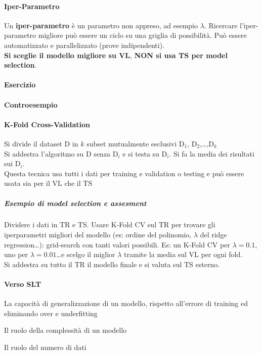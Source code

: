 \documentclass[10pt]{book}
\begin{document}
\paragraph{Iper-Parametro} Un \textbf{iper-parametro} è un parametro non appreso, ad esempio $\lambda$. Ricercare l'iper-parametro migliore può essere un ciclo su una griglia di possibilità. Può essere automatizzato e parallelizzato (prove indipendenti).\\
\textbf{Si sceglie il modello migliore su VL}, \textbf{NON si usa TS per model selection}.
\paragraph{Esercizio} %
\paragraph{Controesempio} %
\paragraph{K-Fold Cross-Validation} Si divide il dataset D in $k$ subset mutualmente esclusivi D$_1$, D$_2$,\ldots,D$_k$\\
Si addestra l'algoritmo su D senza D$_i$ e si testa su D$_i$. Si fa la media dei risultati sui D$_i$.\\
Questa tecnica usa tutti i dati per training e validation o testing e può essere usata sia per il VL che il TS
\subparagraph{Esempio di model selection e assesment} Dividere i dati in TR e TS. Usare K-Fold CV sul TR per trovare gli iperparametri migliori del modello (es: ordine del polinomio, $\lambda$ del ridge regression\ldots): grid-search con tanti valori possibili. Es: un K-Fold CV per $\lambda = 0.1$, uno per $\lambda = 0.01$\ldots e scelgo il miglior $\lambda$ tramite la media sul VL per ogni fold.\\
Si addestra su tutto il TR il modello finale e si valuta sul TS esterno.
\paragraph{Verso SLT} \begin{list}{}{Mettendo tutto insieme}
	\item La capacità di generalizzazione di un modello, rispetto all'errore di training ed eliminando over e underfitting
	\item Il ruolo della complessità di un modello
	\item Il ruolo del numero di dati
\end{list}
\end{document}
